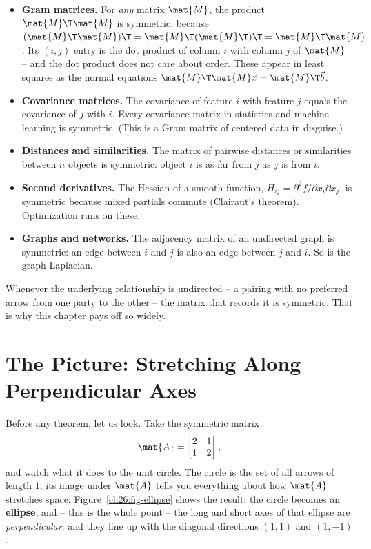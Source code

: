 \begin{itemize}
  \item \textbf{Gram matrices.} For \emph{any} matrix $\mat{M}$, the product
        $\mat{M}\T\mat{M}$ is symmetric, because
        $(\mat{M}\T\mat{M})\T = \mat{M}\T(\mat{M}\T)\T = \mat{M}\T\mat{M}$.
        Its $(i,j)$ entry is the dot product of column $i$ with column $j$ of
        $\mat{M}$ -- and the dot product does not care about order. These appear
        in least squares as the normal equations $\mat{M}\T\mat{M}\vec{x} =
        \mat{M}\T\vec{b}$.
  \item \textbf{Covariance matrices.} The covariance of feature $i$ with feature
        $j$ equals the covariance of $j$ with $i$. Every covariance matrix in
        statistics and machine learning is symmetric. (This is a Gram matrix of
        centered data in disguise.)
  \item \textbf{Distances and similarities.} The matrix of pairwise distances or
        similarities between $n$ objects is symmetric: object $i$ is as far from
        $j$ as $j$ is from $i$.
  \item \textbf{Second derivatives.} The Hessian of a smooth function,
        $H_{ij} = \partial^2 f / \partial x_i \partial x_j$, is symmetric because
        mixed partials commute (Clairaut's theorem). Optimization runs on these.
  \item \textbf{Graphs and networks.} The adjacency matrix of an undirected graph
        is symmetric: an edge between $i$ and $j$ is also an edge between $j$ and
        $i$. So is the graph Laplacian.
\end{itemize}

Whenever the underlying relationship is undirected -- a pairing with no preferred
arrow from one party to the other -- the matrix that records it is symmetric.
That is why this chapter pays off so widely.

\section{The Picture: Stretching Along Perpendicular Axes}
\label{ch26:picture}

Before any theorem, let us look. Take the symmetric matrix
\[
  \mat{A} = \begin{bmatrix} 2 & 1 \\ 1 & 2 \end{bmatrix},
\]
and watch what it does to the unit circle. The circle is the set of all arrows of
length $1$; its image under $\mat{A}$ tells you everything about how $\mat{A}$
stretches space. Figure~\ref{ch26:fig-ellipse} shows the result: the circle
becomes an \textbf{ellipse}, and -- this is the whole point -- the long and short
axes of that ellipse are \emph{perpendicular}, and they line up with the diagonal
directions $(1,1)$ and $(1,-1)$.


